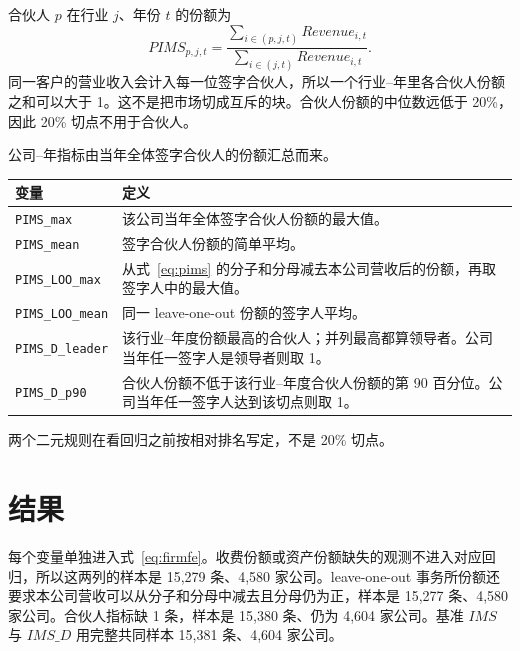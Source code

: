 \documentclass[11pt]{article}
\begin{document}
合伙人 \(p\) 在行业 \(j\)、年份 \(t\) 的份额为
\begin{equation}
PIMS_{p,j,t}=\frac{\sum_{i\in(p,j,t)}Revenue_{i,t}}{\sum_{i\in(j,t)}Revenue_{i,t}}.
\label{eq:pims}
\end{equation}
同一客户的营业收入会计入每一位签字合伙人，所以一个行业--年里各合伙人份额之和可以大于 1。这不是把市场切成互斥的块。合伙人份额的中位数远低于 20\%，因此 20\% 切点不用于合伙人。

公司--年指标由当年全体签字合伙人的份额汇总而来。

\begin{center}
\begin{threeparttable}
\caption{合伙人指标}
\label{tab:pims-def}
\begin{tabular}{lp{10.4cm}}
\toprule
变量 & 定义 \\
\midrule
\texttt{PIMS\_max} & 该公司当年全体签字合伙人份额的最大值。 \\
\texttt{PIMS\_mean} & 签字合伙人份额的简单平均。 \\
\texttt{PIMS\_LOO\_max} & 从式~\eqref{eq:pims} 的分子和分母减去本公司营收后的份额，再取签字人中的最大值。 \\
\texttt{PIMS\_LOO\_mean} & 同一 leave-one-out 份额的签字人平均。 \\
\texttt{PIMS\_D\_leader} & 该行业--年度份额最高的合伙人；并列最高都算领导者。公司当年任一签字人是领导者则取 1。 \\
\texttt{PIMS\_D\_p90} & 合伙人份额不低于该行业--年度合伙人份额的第 90 百分位。公司当年任一签字人达到该切点则取 1。 \\
\bottomrule
\end{tabular}
\end{threeparttable}
\end{center}

两个二元规则在看回归之前按相对排名写定，不是 20\% 切点。

\section{结果}
\label{sec:results}

每个变量单独进入式~\eqref{eq:firmfe}。收费份额或资产份额缺失的观测不进入对应回归，所以这两列的样本是 15,279 条、4,580 家公司。leave-one-out 事务所份额还要求本公司营收可以从分子和分母中减去且分母仍为正，样本是 15,277 条、4,580 家公司。合伙人指标缺 1 条，样本是 15,380 条、仍为 4,604 家公司。基准 \(IMS\) 与 \(IMS\_D\) 用完整共同样本 15,381 条、4,604 家公司。
\end{document}
